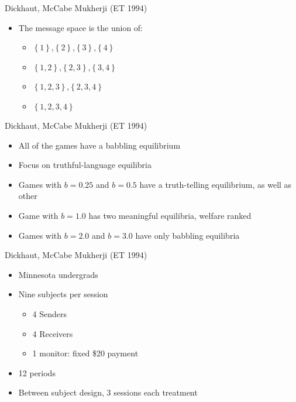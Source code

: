 \documentclass{beamer}
\begin{document}
\begin{frame}{Dickhaut, McCabe Mukherji (ET 1994)}
\begin{itemize}
	\item The message space is the union of:
	\begin{itemize}
		\item $\left\{ 1\right\}$,$\left\{ 2\right\}$,$\left\{ 3\right\}$,$\left\{ 4\right\}$
		\item $\left\{ 1,2\right\}$,$\left\{ 2,3\right\}$,$\left\{ 3,4\right\}$
		\item $\left\{ 1,2,3\right\}$,$\left\{ 2,3,4\right\}$
		\item $\left\{ 1,2,3,4\right\}$
	\end{itemize}
\end{itemize}
\end{frame}

\begin{frame}{Dickhaut, McCabe Mukherji (ET 1994)}
\begin{itemize}
	\item All of the games have a babbling equilibrium
	\item Focus on truthful-language equilibria
	\item Games with $b=0.25$ and $b=0.5$ have a truth-telling equilibrium, as well as other
	\item Game with $b=1.0$ has two meaningful equilibria, welfare ranked
	\item Games with $b=2.0$ and $b=3.0$ have only babbling equilibria
\end{itemize}
\end{frame}

\begin{frame}{Dickhaut, McCabe Mukherji (ET 1994)}
\begin{itemize}
	\item Minnesota undergrads
	\item Nine subjects per session
	\begin{itemize}
		\item 4 Senders
		\item 4 Receivers
		\item 1 monitor: fixed \$20 payment
	\end{itemize}
	\item 12 periods
	\item Between subject design, 3 sessions each treatment
\end{itemize}
\end{frame}
\end{document}
